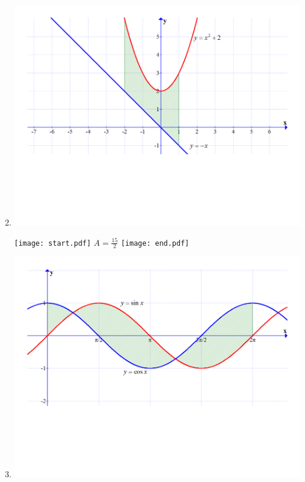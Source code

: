 \documentclass[12pt]{article}
\begin{document}
\begin{enumerate}
\setcounter{enumi}{1}

\item \text{ }

\begin{center}

\includegraphics[scale=0.4]{graph1.pdf}

\texttt{[image: start.pdf]}
{{$A=\frac{15}{2}$}}
\texttt{[image: end.pdf]}


\end{center}

\item \text{ }

\begin{center}

\includegraphics[scale=0.4]{graph2.pdf}


\end{center}
\end{enumerate}
\end{document}
